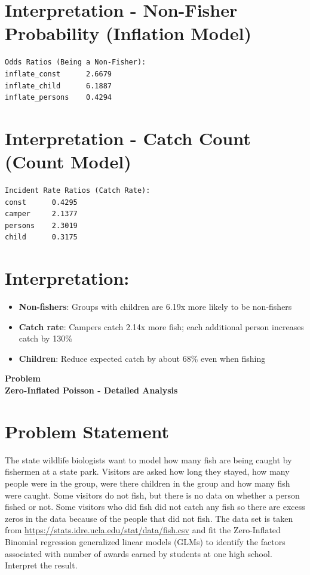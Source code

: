 \documentclass[12pt, a4paper]{article}
\newcounter{problemcounter}
\newcommand{\problemtitle}[1]{%
    \vspace{0.5cm}
    \begin{center}
        \colorbox{DeepGold!20}{\parbox{0.85\textwidth}{\centering
            {\color{RoyalNavy}\Huge\bfseries Problem \arabic{problemcounter}}\\[0.2cm]
            {\color{Charcoal}\large\bfseries #1}
        }}
    \end{center}
    \stepcounter{problemcounter}
    \vspace{0.3cm}
}
\begin{document}
\section*{Interpretation - Non-Fisher Probability (Inflation Model)}
\begin{outputbox}
\begin{verbatim}
Odds Ratios (Being a Non-Fisher):
inflate_const      2.6679
inflate_child      6.1887
inflate_persons    0.4294
\end{verbatim}
\end{outputbox}

\section*{Interpretation - Catch Count (Count Model)}
\begin{outputbox}
\begin{verbatim}
Incident Rate Ratios (Catch Rate):
const      0.4295
camper     2.1377
persons    2.3019
child      0.3175
\end{verbatim}
\end{outputbox}

\section*{Interpretation:}
\begin{itemize}
    \item \textbf{Non-fishers}: Groups with children are 6.19x more likely to be non-fishers
    \item \textbf{Catch rate}: Campers catch 2.14x more fish; each additional person increases catch by 130\%
    \item \textbf{Children}: Reduce expected catch by about 68\% even when fishing
\end{itemize}

\newpage

\problemtitle{Zero-Inflated Poisson - Detailed Analysis}

\section{Problem Statement}The state wildlife biologists want to model how many fish are being caught by fishermen at a state park. Visitors are asked how long they stayed, how many people were in the group, were there children in the group and how many fish were caught. Some visitors do not fish, but there is no data on whether a person fished or not. Some visitors who did fish did not catch any fish so there are excess zeros in the data because of the people that did not fish. The data set is taken from \url{https://stats.idre.ucla.edu/stat/data/fish.csv} and fit the Zero-Inflated Binomial regression generalized linear models (GLMs) to identify the factors associated with number of awards earned by students at one high school. Interpret the result.
\end{document}

